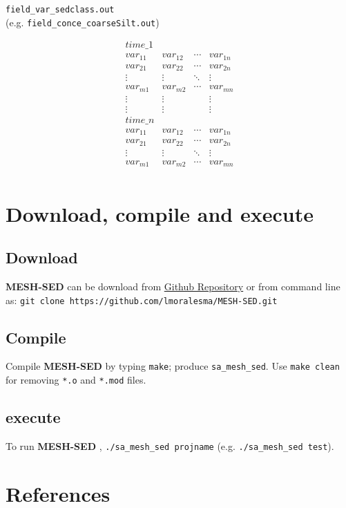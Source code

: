 \documentclass[12pt, letterpaper]{article}
\newcommand{\ms}{\textbf{MESH-SED} }
\begin{document}
{\tiny
\begin{center}
\texttt{field\_var\_sedclass.out}\\
(e.g. \texttt{field\_conce\_coarseSilt.out})
\end{center}
\vspace*{-7mm}
\begin{minipage}[t]{\linewidth}
$$
\begin{matrix}
time\_1 &  & &  \\
var_{11} & var_{12} & \cdots & var_{1n} \\
var_{21} & var_{22} & \cdots & var_{2n} \\
\vdots & \vdots & \ddots & \vdots \\
var_{m1} & var_{m2} & \cdots & var_{mn}\\
\vdots & \vdots &  & \vdots \\
\vdots & \vdots &  & \vdots \\
time\_n &  & &  \\
var_{11} & var_{12} & \cdots & var_{1n} \\
var_{21} & var_{22} & \cdots & var_{2n} \\
\vdots & \vdots & \ddots & \vdots \\
var_{m1} & var_{m2} & \cdots & var_{mn}\\
\end{matrix}
$$
\end{minipage}
}

\section{Download, compile and execute}
\subsection{Download}
\ms can be download from \href{https://github.com/lmoralesma/MESH-SED}{Github Repository} or from command line as: \texttt{git clone https://github.com/lmoralesma/MESH-SED.git}

\subsection{Compile}
Compile \ms by typing \texttt{make}; produce \texttt{sa\_mesh\_sed}. Use  \texttt{make clean} for removing \texttt{*.o} and \texttt{*.mod} files.

\subsection{execute}
To run \ms, \texttt{./sa\_mesh\_sed projname} (e.g. \texttt{./sa\_mesh\_sed test}).

\section{References}
 
 
\end{document}
